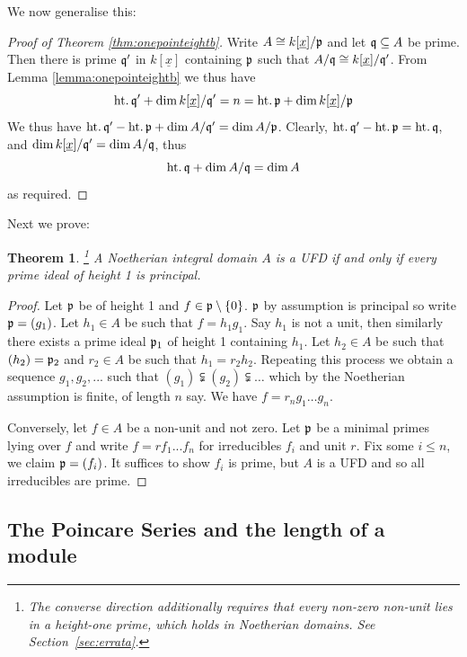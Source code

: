 \documentclass[12pt]{article}
\theoremstyle{plain}
\newtheorem{thm}{Theorem}[subsection] %
\theoremstyle{definition}
\begin{document}
We now generalise this:
\begin{proof}[Proof of Theorem \ref{thm:onepointeightb}]
Write $A \cong k[\underline{x}]/\frak{p}$ and let $\frak{q} \subseteq A$ be prime. Then there is prime $\frak{q}'$ in $k[\underline{x}]$ containing $\frak{p}$ such that $A/\frak{q} \cong k[\underline{x}]/\frak{q}'$. From Lemma \ref{lemma:onepointeightb} we thus have
\[\operatorname{ht.}\frak{q}' + \operatorname{dim}k[\underline{x}]/\frak{q}' = n = \operatorname{ht.}\frak{p} + \operatorname{dim}k[\underline{x}]/\frak{p}\]
We thus have $\operatorname{ht.}\frak{q}' - \operatorname{ht.}\frak{p} + \operatorname{dim}A/\frak{q}' = \operatorname{dim}A/\frak{p}$. Clearly, $\operatorname{ht.}\frak{q}' - \operatorname{ht.}\frak{p} = \operatorname{ht.}\frak{q}$, and $\operatorname{dim}k[\underline{x}]/\frak{q}' = \operatorname{dim}A/\frak{q}$, thus
\[\operatorname{ht.}\frak{q} + \operatorname{dim}A/\frak{q} = \operatorname{dim}A\]
as required.
\end{proof}
Next we prove:
\begin{thm}
\label{thm:onepointonetwoa}\footnote{The converse direction additionally requires that every non-zero non-unit lies in a height-one prime, which holds in Noetherian domains. See Section~\ref{sec:errata}.}
A Noetherian integral domain $A$ is a UFD if and only if every prime ideal of height 1 is principal.
\end{thm}
\begin{proof}
Let $\frak{p}$ be of height 1 and $f \in \frak{p}\setminus\lbrace 0\rbrace$. $\frak{p}$ by assumption is principal so write $\frak{p} = (g_1)$. Let $h_1 \in A$ be such that $f = h_1g_1$. Say $h_1$ is not a unit, then similarly there exists a prime ideal $\frak{p}_1$ of height 1 containing $h_1$. Let $h_2 \in A$ be such that $(h_2) = \frak{p}_2$ and $r_2 \in A$ be such that $h_1 = r_2h_2$. Repeating this process we obtain a sequence $g_1,g_2,...$ such that $(g_1) \subsetneqq (g_2) \subsetneqq \hdots$ which by the Noetherian assumption is finite, of length $n$ say. We have $f = r_n g_1\hdots g_n$.

Conversely, let $f \in A$ be a non-unit and not zero. Let $\frak{p}$ be a minimal primes lying over $f$ and write $f =rf_1...f_n$ for irreducibles $f_i$ and unit $r$. Fix some $i \leq n$, we claim $\frak{p} = (f_i)$. It suffices to show $f_i$ is prime, but $A$ is a UFD and so all irreducibles are prime.
\end{proof}

\subsection{The Poincare Series and the length of a module}
\end{document}
